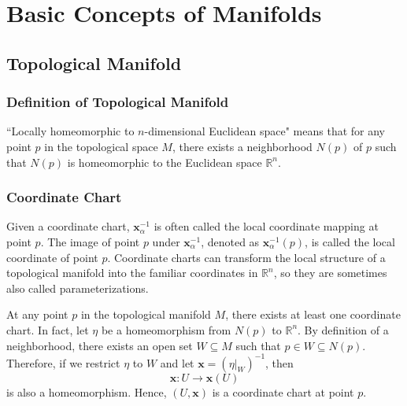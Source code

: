 \documentclass{report}
\begin{document}
\chapter{Basic Concepts of Manifolds}
\section{Topological Manifold}
\subsection{Definition of Topological Manifold}
``Locally homeomorphic to $n$-dimensional Euclidean space" means that for any point $p$ in the topological space $M$, there exists a neighborhood $N(p)$ of $p$ such that $N(p)$ is homeomorphic to the Euclidean space $\mathbb{R}^n$.

\subsection{Coordinate Chart}


Given a coordinate chart, $\mathbf{x}^{-1}_{\alpha}$ is often called the local coordinate mapping at point $p$. The image of point $p$ under $\mathbf{x}^{-1}_{\alpha}$, denoted as $\mathbf{x}^{-1}_\alpha(p)$, is called the local coordinate of point $p$. Coordinate charts can transform the local structure of a topological manifold into the familiar coordinates in $\mathbb{R}^n$, so they are sometimes also called parameterizations.

At any point $p$ in the topological manifold $M$, there exists at least one coordinate chart. In fact, let $\eta$ be a homeomorphism from $N(p)$ to $\mathbb{R}^n$. By definition of a neighborhood, there exists an open set $W\subseteq M$ such that $p\in W\subseteq N(p)$. Therefore, if we restrict $\eta$ to $W$ and let $\mathbf{x}=(\left.\eta\right|_{W})^{-1}$, then
$$
    \mathbf{x}:U\longrightarrow \mathbf{x}(U)
$$
is also a homeomorphism. Hence, $(U,\mathbf{x})$ is a coordinate chart at point $p$.
\end{document}
